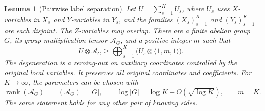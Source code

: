\documentclass[11pt]{article}
\numberwithin{equation}{section}
\newtheorem{lemma}[theorem]{Lemma}
\theoremstyle{definition}
\theoremstyle{remark}
\DeclareMathOperator{\rank}{rank}
\DeclareMathOperator{\brank}{\underline R}
\begin{document}
\begin{lemma}[Pairwise label separation]
\label{lem:group}
\label{lem:separator}
Let \(U=\sum_{s=1}^{K}U_s\), where \(U_s\) uses \(X\)-variables in
\(X_s\) and \(Y\)-variables in \(Y_s\), and the families
\((X_s)_{s=1}^K\) and \((Y_s)_{s=1}^K\) are each disjoint.  The
\(Z\)-variables may overlap.  There are a finite abelian group \(G\), its
group multiplication tensor \(\mathcal A_G\), and a positive integer
\(m\) such that
\begin{equation}
 U\otimes\mathcal A_G\unrhd
 \bigoplus_{s=1}^{K}\bigl(U_s\otimes\langle1,m,1\rangle\bigr).
 \label{alg:group-identity}
\end{equation}
The degeneration is a zeroing-out on auxiliary coordinates controlled by
the original local variables.  It preserves all original coordinates and
coefficients.  For \(K\to\infty\), the parameters can be chosen with
\begin{equation}
 \rank(\mathcal A_G)=\brank(\mathcal A_G)=|G|,
 \qquad
 \log|G|=\log K+O(\sqrt{\log K}),
 \qquad
 m=K.
 \label{alg:group-rates}
\end{equation}
The same statement holds for any other pair of knowing sides.
\end{lemma}
\end{document}
